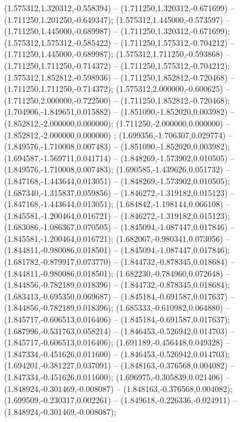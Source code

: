  (1.575312,1.320312,-0.558394) -- (1.711250,1.320312,-0.671699) -- (1.711250,1.201250,-0.649347);
 (1.575312,1.445000,-0.573597) -- (1.711250,1.445000,-0.689987) -- (1.711250,1.320312,-0.671699);
 (1.575312,1.575312,-0.585422) -- (1.711250,1.575312,-0.704212) -- (1.711250,1.445000,-0.689987);
 (1.575312,1.711250,-0.593868) -- (1.711250,1.711250,-0.714372) -- (1.711250,1.575312,-0.704212);
 (1.575312,1.852812,-0.598936) -- (1.711250,1.852812,-0.720468) -- (1.711250,1.711250,-0.714372);
 (1.575312,2.000000,-0.600625) -- (1.711250,2.000000,-0.722500) -- (1.711250,1.852812,-0.720468);
 (1.704906,-1.849651,0.015882) -- (1.851090,-1.852020,0.003982) -- (1.852812,-2.000000,0.000000);
 (1.711250,-2.000000,0.000000) -- (1.852812,-2.000000,0.000000) ;
 (1.699356,-1.706307,0.029774) -- (1.849576,-1.710008,0.007483) -- (1.851090,-1.852020,0.003982);
 (1.694587,-1.569711,0.041714) -- (1.848269,-1.573902,0.010505) -- (1.849576,-1.710008,0.007483);
 (1.690585,-1.439626,0.051732) -- (1.847168,-1.443644,0.013051) -- (1.848269,-1.573902,0.010505);
 (1.687340,-1.315837,0.059856) -- (1.846272,-1.319182,0.015123) -- (1.847168,-1.443644,0.013051);
 (1.684842,-1.198144,0.066108) -- (1.845581,-1.200464,0.016721) -- (1.846272,-1.319182,0.015123);
 (1.683086,-1.086367,0.070505) -- (1.845094,-1.087447,0.017846) -- (1.845581,-1.200464,0.016721);
 (1.682067,-0.980341,0.073056) -- (1.844811,-0.980086,0.018501) -- (1.845094,-1.087447,0.017846);
 (1.681782,-0.879917,0.073770) -- (1.844732,-0.878345,0.018684) -- (1.844811,-0.980086,0.018501);
 (1.682230,-0.784960,0.072648) -- (1.844856,-0.782189,0.018396) -- (1.844732,-0.878345,0.018684);
 (1.683413,-0.695350,0.069687) -- (1.845184,-0.691587,0.017637) -- (1.844856,-0.782189,0.018396);
 (1.685333,-0.610982,0.064880) -- (1.845717,-0.606513,0.016406) -- (1.845184,-0.691587,0.017637);
 (1.687996,-0.531763,0.058214) -- (1.846453,-0.526942,0.014703) -- (1.845717,-0.606513,0.016406);
 (1.691189,-0.456448,0.049328) -- (1.847334,-0.451626,0.011600) -- (1.846453,-0.526942,0.014703);
 (1.694201,-0.381227,0.037091) -- (1.848163,-0.376568,0.004082) -- (1.847334,-0.451626,0.011600);
 (1.696975,-0.305839,0.021406) -- (1.848924,-0.301469,-0.008087) -- (1.848163,-0.376568,0.004082);
 (1.699509,-0.230317,0.002261) -- (1.849618,-0.226336,-0.024911) -- (1.848924,-0.301469,-0.008087);
